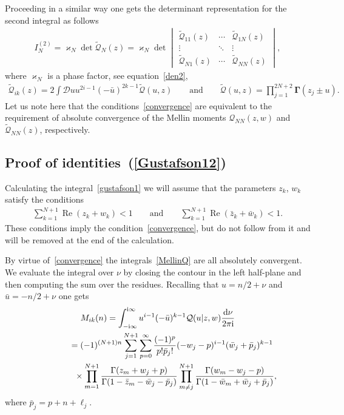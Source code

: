 Proceeding in a similar way one gets the determinant representation for the second integral as follows
\begin{gather*}%
I_N^{(2)} =\varkappa_N \det \boldsymbol{\widetilde {\mathcal Q}}_N(z)=\varkappa_N \det \begin{vmatrix}
\widetilde{\mathcal{Q}}_{11}(z)&\cdots& \widetilde{\mathcal{Q}}_{1N}(z)\\
\vdots & \ddots &\vdots\\
\widetilde{\mathcal{Q}}_{N1}(z)&\cdots& \widetilde{\mathcal{Q}}_{NN}(z)
\end{vmatrix},
\end{gather*}
where $\varkappa_N$ is a phase factor, see equation~\eqref{den2},
\begin{gather*}
\widetilde {\mathcal Q}_{ik}(z)=2\int \mathcal{D}u u^{2i-1}(-\bar u)^{2k-1} \widetilde {\mathcal Q}(u,z) \qquad\text{and}
\qquad
\widetilde{ \mathcal Q}(u,z)=\prod_{j=1}^{2N+2} \boldsymbol\Gamma(z_j\pm u).
\end{gather*}
Let us note here that the conditions~\eqref{convergence} are equivalent to the requirement of absolute convergence of the Mellin moments $\mathcal Q_{NN}(z,w)$ and $\widetilde{\mathcal Q}_{NN}(z)$, respectively.

\subsection{Proof of identities~(\ref{Gustafson12})}\label{subsec:proof}

Calculating the integral~\eqref{gustafson1} we will assume that the parameters $z_k$, $w_k$ satisfy the conditions
\begin{gather}\label{zw-cond}
\sum_{k=1}^{N+1} \operatorname{Re}(z_k+w_k)<1 \qquad \text{and} \qquad \sum_{k=1}^{N+1} \operatorname{Re} (\bar z_k+\bar w_k)<1.
\end{gather}
These conditions imply the condition~\eqref{convergence}, but do not follow from it and will be removed at the end of the calculation.

By virtue of~\eqref{convergence} the integrals~\eqref{MellinQ} are all absolutely convergent. We evaluate the integral
over $\nu$ by closing the contour in the left half-plane and then computing the sum over the residues. Recalling that
$u=n/2+\nu$ and $\bar u=-n/2+\nu$ one gets
\begin{gather*}
M_{ik}(n) =\int^{{\rm i}\infty}_{-{\rm i}\infty} u^{i-1}(-\bar u)^{k-1} \mathcal Q(u|z,w) \frac{{\rm d}\nu}{2\pi {\rm i}}\notag\\
\hphantom{M_{ik}(n)}{} =
(-1)^{(N+1)n}\sum_{j=1}^{N+1} \sum_{p=0}^{\infty}\frac{(-1)^p}{p! \bar p_j!} (-w_{j}-p)^{i-1} (\bar w_{j} + \bar p_j)^{k-1}\notag\\
\hphantom{M_{ik}(n)=}{} \times
\prod_{m=1}^{N+1} \frac{\Gamma(z_m+w_{j}+p)}{\Gamma(1-\bar z_m-\bar w_{j}-\bar p_j)}
\prod_{m \neq j}^{N+1} \frac{\Gamma(w_m-w_{j}-p)}{\Gamma(1-\bar w_m+ \bar w_{j}+ \bar p_j)},%
\end{gather*}
where $\bar p_j = p+n+\ell_j$.

